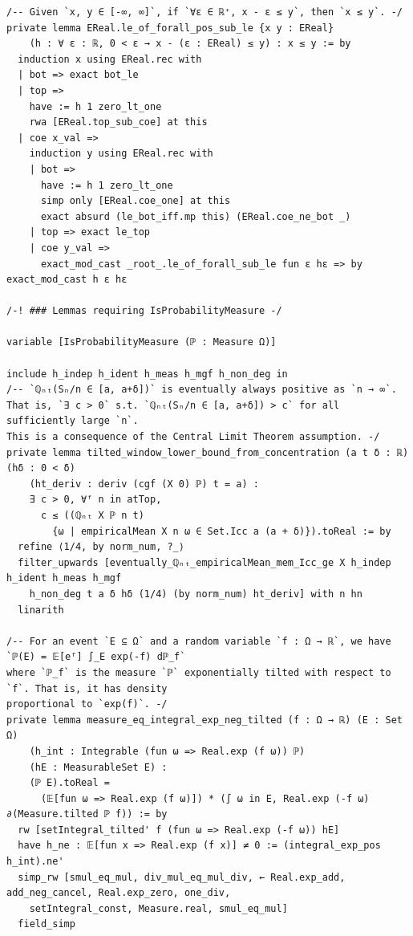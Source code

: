 \newpage
\begin{lstlisting}
/-- Given `x, y ∈ [-∞, ∞]`, if `∀ε ∈ ℝ⁺, x - ε ≤ y`, then `x ≤ y`. -/
private lemma EReal.le_of_forall_pos_sub_le {x y : EReal}
    (h : ∀ ε : ℝ, 0 < ε → x - (ε : EReal) ≤ y) : x ≤ y := by
  induction x using EReal.rec with
  | bot => exact bot_le
  | top =>
    have := h 1 zero_lt_one
    rwa [EReal.top_sub_coe] at this
  | coe x_val =>
    induction y using EReal.rec with
    | bot =>
      have := h 1 zero_lt_one
      simp only [EReal.coe_one] at this
      exact absurd (le_bot_iff.mp this) (EReal.coe_ne_bot _)
    | top => exact le_top
    | coe y_val =>
      exact_mod_cast _root_.le_of_forall_sub_le fun ε hε => by exact_mod_cast h ε hε

/-! ### Lemmas requiring IsProbabilityMeasure -/

variable [IsProbabilityMeasure (ℙ : Measure Ω)]

include h_indep h_ident h_meas h_mgf h_non_deg in
/-- `ℚₙₜ(Sₙ/n ∈ [a, a+δ])` is eventually always positive as `n → ∞`.
That is, `∃ c > 0` s.t. `ℚₙₜ(Sₙ/n ∈ [a, a+δ]) > c` for all sufficiently large `n`.
This is a consequence of the Central Limit Theorem assumption. -/
private lemma tilted_window_lower_bound_from_concentration (a t δ : ℝ) (hδ : 0 < δ)
    (ht_deriv : deriv (cgf (X 0) ℙ) t = a) :
    ∃ c > 0, ∀ᶠ n in atTop,
      c ≤ ((ℚₙₜ X ℙ n t)
        {ω | empiricalMean X n ω ∈ Set.Icc a (a + δ)}).toReal := by
  refine ⟨1/4, by norm_num, ?_⟩
  filter_upwards [eventually_ℚₙₜ_empiricalMean_mem_Icc_ge X h_indep h_ident h_meas h_mgf
    h_non_deg t a δ hδ (1/4) (by norm_num) ht_deriv] with n hn
  linarith

/-- For an event `E ⊆ Ω` and a random variable `f : Ω → ℝ`, we have  `ℙ(E) = 𝔼[eᶠ] ∫_E exp(-f) dℙ_f`
where `ℙ_f` is the measure `ℙ` exponentially tilted with respect to `f`. That is, it has density
proportional to `exp(f)`. -/
private lemma measure_eq_integral_exp_neg_tilted (f : Ω → ℝ) (E : Set Ω)
    (h_int : Integrable (fun ω => Real.exp (f ω)) ℙ)
    (hE : MeasurableSet E) :
    (ℙ E).toReal =
      (𝔼[fun ω => Real.exp (f ω)]) * (∫ ω in E, Real.exp (-f ω) ∂(Measure.tilted ℙ f)) := by
  rw [setIntegral_tilted' f (fun ω => Real.exp (-f ω)) hE]
  have h_ne : 𝔼[fun x => Real.exp (f x)] ≠ 0 := (integral_exp_pos h_int).ne'
  simp_rw [smul_eq_mul, div_mul_eq_mul_div, ← Real.exp_add, add_neg_cancel, Real.exp_zero, one_div,
    setIntegral_const, Measure.real, smul_eq_mul]
  field_simp
\end{lstlisting}
\newpage
